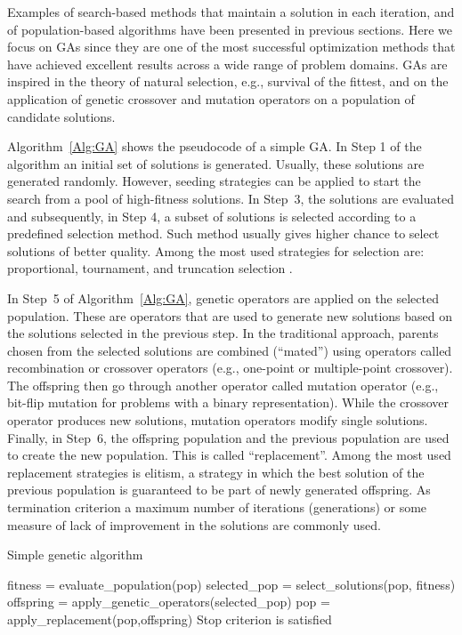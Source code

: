  Examples of search-based methods that maintain a solution in each iteration, and of population-based algorithms have been presented in previous sections. Here we focus on  GAs  \cite{Goldberg:1989} since they are  one of the most successful optimization methods that have achieved excellent results across a wide range of problem domains. GAs are inspired in the theory of natural selection, e.g., survival of the fittest, and on the application of genetic crossover and mutation operators on a population of candidate solutions.

 Algorithm~\ref{Alg:GA} shows the pseudocode of a simple GA. In Step 1 of the algorithm an initial set of solutions is generated. Usually, these solutions are generated randomly. However, seeding strategies can be applied to start the search from a pool of high-fitness solutions. In Step~3, the solutions are evaluated and subsequently, in Step 4, a subset of solutions is selected according to a predefined selection method. Such method usually gives higher chance to select solutions of better quality. Among the most used strategies for selection are: proportional, tournament, and truncation selection \cite{Blickle_and_Thiele:1996}. 

 In Step~5 of Algorithm~\ref{Alg:GA},  genetic operators are applied on the selected population. These are operators that are used to generate new solutions based on the solutions selected in the previous step.  In the traditional approach, parents chosen from the selected solutions are combined (``mated'') using operators called recombination or crossover operators (e.g., one-point or multiple-point crossover). The offspring then go through another operator called mutation operator (e.g., bit-flip mutation for problems with a binary representation).  While the crossover operator produces new solutions, mutation operators modify single solutions. Finally, in Step~6, the offspring population and the previous population are used to create the new population. This is called ``replacement''.  Among the most used replacement strategies is elitism, a strategy in which the best solution of the previous population is guaranteed to be part of newly generated offspring. As termination criterion a  maximum number of iterations (generations) or some measure of lack of improvement in the solutions are commonly used. 

  \begin{algorithm}[ht!]
  \caption{Simple genetic algorithm}
   
    \begin{algorithmic}[1] 

      \REPEAT 
         \STATE  fitness = evaluate\_population(pop)
         \STATE  selected\_pop = select\_solutions(pop, fitness)
         \STATE  offspring = apply\_genetic\_operators(selected\_pop)
         \STATE  pop =  apply\_replacement(pop,offspring)
      \UNTIL Stop criterion is satisfied		
     \end{algorithmic}
	
 \label{Alg:GA}
  \end{algorithm}


